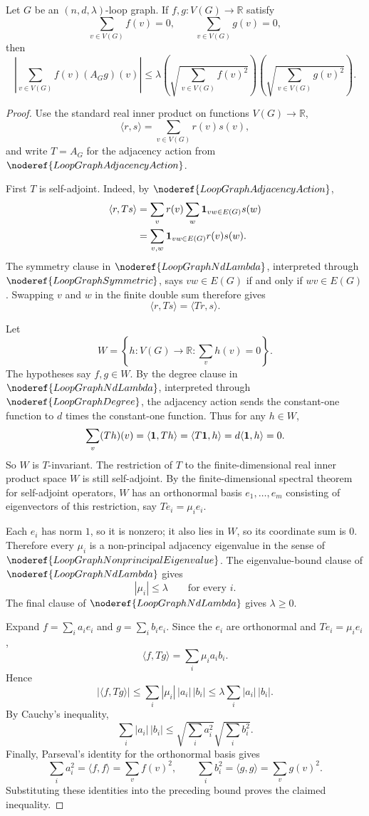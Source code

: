 \begin{helper}
Let \(G\) be an \((n,d,\lambda)\)-loop graph. If \(f,g\colon V(G)\to\mathbb R\) satisfy
\[
  \sum_{v\in V(G)}f(v)=0,
  \qquad
  \sum_{v\in V(G)}g(v)=0,
\]
then
\[
  \left|\sum_{v\in V(G)} f(v)(A_Gg)(v)\right|
  \le
  \lambda
  \left(\sqrt{\sum_{v\in V(G)} f(v)^2}\right)
  \left(\sqrt{\sum_{v\in V(G)} g(v)^2}\right).
\]
\end{helper}
\begin{proof}
Use the standard real inner product on functions \(V(G)\to\mathbb R\),
\[
  \langle r,s\rangle=\sum_{v\in V(G)}r(v)s(v),
\]
and write \(T=A_G\) for the adjacency action from \(\noderef{LoopGraphAdjacencyAction}\).

First \(T\) is self-adjoint. Indeed, by \(\noderef{LoopGraphAdjacencyAction}\),
\[
\begin{aligned}
  \langle r,Ts\rangle
  &=\sum_v r(v)\sum_w {\bf 1}_{vw\in E(G)}s(w)  \\
  &=\sum_{v,w}{\bf 1}_{vw\in E(G)}r(v)s(w).
\end{aligned}
\]
The symmetry clause in \(\noderef{LoopGraphNdLambda}\), interpreted through \(\noderef{LoopGraphSymmetric}\), says \(vw\in E(G)\) if and only if \(wv\in E(G)\). Swapping \(v\) and \(w\) in the finite double sum therefore gives
\[
  \langle r,Ts\rangle=\langle Tr,s\rangle.
\]

Let
\[
  W=\left\{h:V(G)\to\mathbb R:\sum_v h(v)=0\right\}.
\]
The hypotheses say \(f,g\in W\). By the degree clause in \(\noderef{LoopGraphNdLambda}\), interpreted through \(\noderef{LoopGraphDegree}\), the adjacency action sends the constant-one function to \(d\) times the constant-one function. Thus for any \(h\in W\),
\[
  \sum_v (Th)(v)=\langle {\bf 1},Th\rangle
  =\langle T{\bf 1},h\rangle
  =d\langle {\bf 1},h\rangle=0.
\]
So \(W\) is \(T\)-invariant. The restriction of \(T\) to the finite-dimensional real inner product space \(W\) is still self-adjoint. By the finite-dimensional spectral theorem for self-adjoint operators, \(W\) has an orthonormal basis \(e_1,\dots,e_m\) consisting of eigenvectors of this restriction, say \(Te_i=\mu_i e_i\).

Each \(e_i\) has norm \(1\), so it is nonzero; it also lies in \(W\), so its coordinate sum is \(0\). Therefore every \(\mu_i\) is a non-principal adjacency eigenvalue in the sense of \(\noderef{LoopGraphNonprincipalEigenvalue}\). The eigenvalue-bound clause of \(\noderef{LoopGraphNdLambda}\) gives
\[
  |\mu_i|\le \lambda
  \qquad\text{for every }i.
\]
The final clause of \(\noderef{LoopGraphNdLambda}\) gives \(\lambda\ge 0\).

Expand \(f=\sum_i a_i e_i\) and \(g=\sum_i b_i e_i\). Since the \(e_i\) are orthonormal and \(Te_i=\mu_i e_i\),
\[
  \langle f,Tg\rangle
  =
  \sum_i \mu_i a_i b_i.
\]
Hence
\[
  |\langle f,Tg\rangle|
  \le
  \sum_i |\mu_i|\,|a_i|\,|b_i|
  \le
  \lambda\sum_i |a_i|\,|b_i|.
\]
By Cauchy's inequality,
\[
  \sum_i |a_i|\,|b_i|
  \le
  \sqrt{\sum_i a_i^2}\sqrt{\sum_i b_i^2}.
\]
Finally, Parseval's identity for the orthonormal basis gives
\[
  \sum_i a_i^2=\langle f,f\rangle=\sum_v f(v)^2,
  \qquad
  \sum_i b_i^2=\langle g,g\rangle=\sum_v g(v)^2.
\]
Substituting these identities into the preceding bound proves the claimed inequality.
\end{proof}
